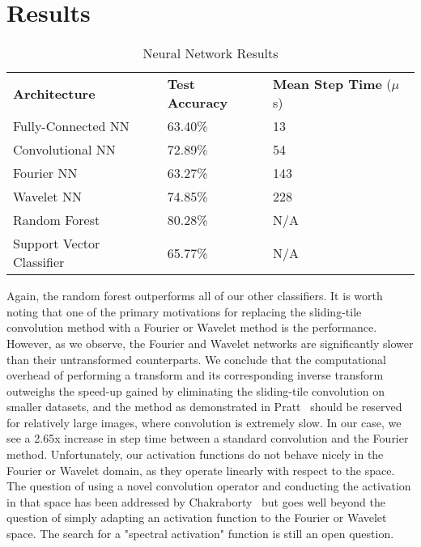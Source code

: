\section{Results}
\begin{table}[ht]
\caption{Neural Network Results}
\centering
\label{Tab:test}	
\begin{tabular}{l|ll}
\textbf{Architecture}  & \textbf{Test Accuracy} & \textbf{Mean Step Time} ($\mu$s) \\\cline{1-3}
Fully-Connected NN            & 63.40\%         & 13\\
Convolutional NN              & 72.89\%         & 54\\  
Fourier NN                    & 63.27\%         & 143\\
Wavelet NN                    & 74.85\%         & 228\\
Random Forest                 & 80.28\%         & N/A\\ 
Support Vector Classifier     & 65.77\%         & N/A       
\end{tabular}
\end{table}

Again, the random forest outperforms all of our other classifiers.
It is worth noting that one of the primary motivations for replacing the sliding-tile convolution method with a Fourier or Wavelet method is the performance.
However, as we observe, the Fourier and Wavelet networks are significantly slower than their untransformed counterparts.
We conclude that the computational overhead of performing a transform and its corresponding inverse transform outweighs the speed-up gained by eliminating the sliding-tile convolution on smaller datasets, and the method as demonstrated in Pratt~\cite{pratt2017fcnn} should be reserved for relatively large images, where convolution is extremely slow.
In our case, we see a 2.65x increase in step time between a standard convolution and the Fourier method. 
Unfortunately, our activation functions do not behave nicely in the Fourier or Wavelet domain, as they operate linearly with respect to the space. 
The question of using a novel convolution operator and conducting the activation in that space has been addressed by Chakraborty~\cite{chakraborty2019surreal} but goes well beyond the question of simply adapting an activation function to the Fourier or Wavelet space.
The search for a "spectral activation" function is still an open question.